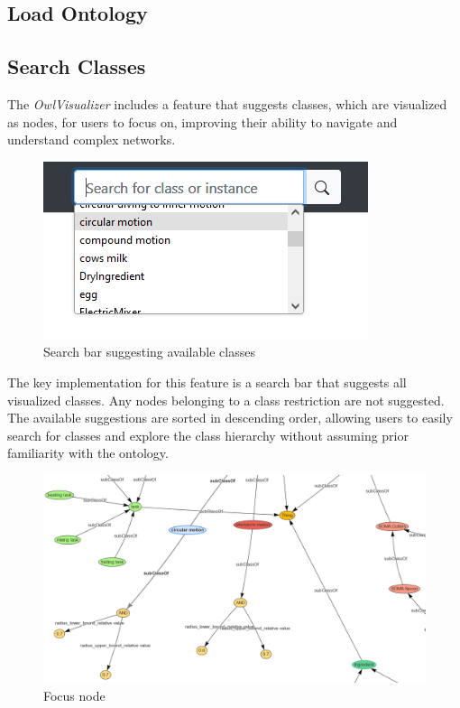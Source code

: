 \subsection{Load Ontology}

\subsection{Search Classes}
The \textit{OwlVisualizer} includes a feature that suggests classes, which are visualized as nodes, 
for users to focus on, improving their ability to navigate and understand complex networks.

\begin{figure}[H]
    \includegraphics[scale=0.6]{Graphics/OwlVisualizer/searchClass1.png}
    \centering
    \caption{Search bar suggesting available classes}
\end{figure}

The key implementation for this feature is a search bar that suggests all visualized classes. 
Any nodes belonging to a class restriction are not suggested. 
The available suggestions are sorted in descending order, allowing users to easily search
for classes and explore the class hierarchy without assuming prior familiarity with the ontology.

\begin{figure}[H]
    \includegraphics[scale=0.25]{Graphics/OwlVisualizer/searchClass2.png}
    \centering
    \caption{Focus node}
\end{figure}

